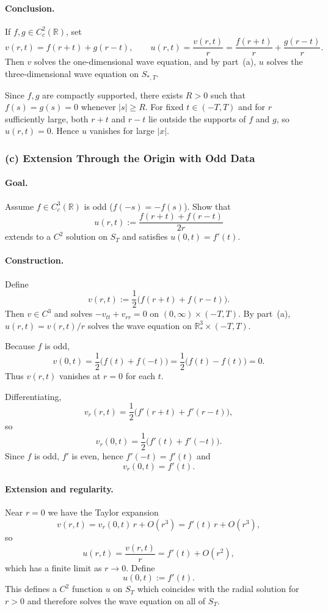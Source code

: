 \documentclass[12pt,a4paper]{article}
\theoremstyle{plain}
\theoremstyle{definition}
\theoremstyle{remark}
\theoremstyle{remark}
\begin{document}
\paragraph{\textbf{Conclusion.}}
If $f,g\in C_c^2(\mathbb{R})$, set
\[
v(r,t) = f(r+t) + g(r-t),
\qquad
u(r,t) = \frac{v(r,t)}{r}
= \frac{f(r+t)}{r} + \frac{g(r-t)}{r}.
\]
Then $v$ solves the one-dimensional wave equation, and by part~(a),
$u$ solves the three-dimensional wave equation on $S_{*,T}$.

Since $f,g$ are compactly supported, there exists $R>0$ such that
$f(s)=g(s)=0$ whenever $|s|\ge R$. For fixed $t\in(-T,T)$ and for $r$
sufficiently large, both $r+t$ and $r-t$ lie outside the supports of
$f$ and $g$, so $u(r,t)=0$. Hence $u$ vanishes for large $|x|$.

\subsubsection*{(c) \; Extension Through the Origin with Odd Data}

\paragraph{\textbf{Goal.}}
Assume $f\in C_c^3(\mathbb{R})$ is odd ($f(-s)=-f(s)$). Show that
\[
u(r,t) := \frac{f(r+t)+f(r-t)}{2r}
\]
extends to a $C^2$ solution on $S_T$ and satisfies $u(0,t)=f'(t)$.

\paragraph{\textbf{Construction.}}
Define
\[
v(r,t) := \frac12\bigl(f(r+t)+f(r-t)\bigr).
\]
Then $v\in C^3$ and solves $-v_{tt}+v_{rr}=0$ on $(0,\infty)\times(-T,T)$.
By part~(a), $u(r,t)=v(r,t)/r$ solves the wave equation on
$\mathbb{R}^3_*\times(-T,T)$.

Because $f$ is odd,
\[
v(0,t)
= \frac12\bigl(f(t)+f(-t)\bigr)
= \frac12\bigl(f(t)-f(t)\bigr)
= 0.
\]
Thus $v(r,t)$ vanishes at $r=0$ for each $t$.

Differentiating,
\[
v_r(r,t) = \frac12\bigl(f'(r+t)+f'(r-t)\bigr),
\]
so
\[
v_r(0,t)
= \frac12\bigl(f'(t)+f'(-t)\bigr).
\]
Since $f$ is odd, $f'$ is even, hence $f'(-t)=f'(t)$ and
\[
v_r(0,t) = f'(t).
\]

\paragraph{\textbf{Extension and regularity.}}
Near $r=0$ we have the Taylor expansion
\[
v(r,t) = v_r(0,t)\,r + O(r^3) = f'(t)\,r + O(r^3),
\]
so
\[
u(r,t) = \frac{v(r,t)}{r} = f'(t) + O(r^2),
\]
which has a finite limit as $r\to0$. Define
\[
u(0,t) := f'(t).
\]
This defines a $C^2$ function $u$ on $S_T$ which coincides with the
radial solution for $r>0$ and therefore solves the wave equation on all
of $S_T$.
\end{document}
